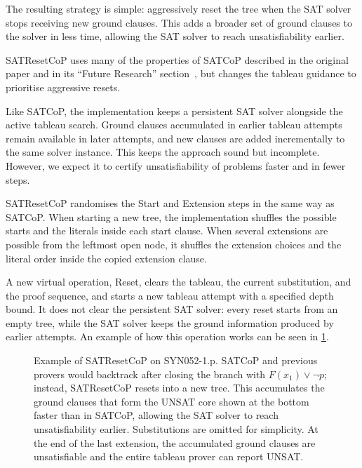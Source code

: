 \documentclass{EasyChair3.5/easychair}
\newcommand{\step}[1]{\textsf{#1}}
\newcommand{\cop}[1]{\textsf{#1}}
\begin{document}
The resulting strategy is simple: aggressively reset the tree when the SAT solver stops receiving new ground clauses.
This adds a broader set of ground clauses to the solver in less time, allowing the SAT solver to reach unsatisfiability earlier.

\cop{SATResetCoP} uses many of the properties of \cop{SATCoP} described in the original paper and in its ``Future Research'' section~\cite[\S~9.1]{satcop}, but changes the tableau guidance to prioritise aggressive resets.

Like \cop{SATCoP}, the implementation keeps a persistent SAT solver alongside the active tableau search.
Ground clauses accumulated in earlier tableau attempts remain available in later attempts, and new clauses are added incrementally to the same solver instance.
This keeps the approach sound but incomplete.
However, we expect it to certify unsatisfiability of problems faster and in fewer steps.

\cop{SATResetCoP} randomises the \step{Start} and \step{Extension} steps in the same way as \cop{SATCoP}.
When starting a new tree, the implementation shuffles the possible starts and the literals inside each start clause.
When several extensions are possible from the leftmost open node, it shuffles the extension choices and the literal order inside the copied extension clause.

A new virtual operation, \step{Reset}, clears the tableau, the current substitution, and the proof sequence, and starts a new tableau attempt with a specified depth bound.
It does not clear the persistent SAT solver: every reset starts from an empty tree, while the SAT solver keeps the ground information produced by earlier attempts.
An example of how this operation works can be seen in \cref{reset_example}.

\begin{figure}[h]
	\centering
	\framebox[\linewidth][c]{\resizebox{\linewidth}{!}{}}
	\caption{Example of \cop{SATResetCoP} on \step{SYN052-1.p}. \cop{SATCoP} and previous provers would backtrack after closing the branch with $F(x_1) \vee \neg p$; instead, \cop{SATResetCoP} resets into a new tree. This accumulates the ground clauses that form the UNSAT core shown at the bottom faster than in \cop{SATCoP}, allowing the SAT solver to reach unsatisfiability earlier. Substitutions are omitted for simplicity. At the end of the last extension, the accumulated ground clauses are unsatisfiable and the entire tableau prover can report UNSAT.}
	\label{reset_example}
\end{figure}
\end{document}
